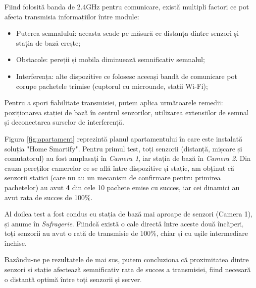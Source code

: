 Fiind folosită banda de 2.4GHz pentru comunicare, există multipli factori ce pot afecta transmisia informațiilor între module:
\begin{itemize}
	\item Puterea semnalului: aceasta scade pe măsură ce distanța dintre senzori și stația de bază crește;
	
	\item Obstacole: pereții și mobila diminuează semnificativ semnalul;
	
	\item Interferența: alte dispozitive ce folosesc aceeași bandă de comunicare pot corupe pachetele trimise (cuptorul cu microunde, stații Wi-Fi);
\end{itemize}

Pentru a spori fiabilitate transmisiei, putem aplica următoarele  remedii: poziționarea stației de bază în centrul senzorilor, utilizarea extensiilor de semnal și deconectarea surselor de interferență.

Figura \ref{fig:apartament} reprezintă planul apartamentului în care este instalată soluția "Home Smartify". Pentru primul test, toți senzorii (distanță, mișcare și comutatorul) au fost amplasați în \emph{Camera 1}, iar stația de bază în \emph{Camera 2}. Din cauza pereților camerelor ce se află între dispozitive și stație, am obținut că senzorii statici (care nu au un mecanism de confirmare pentru primirea pachetelor) au avut \textbf{4} din cele 10 pachete emise cu succes, iar cei dinamici au avut rata de succes de 100\%.

Al doilea test a fost condus cu stația de bază mai aproape de senzori (Camera 1), și anume în \emph{Sufragerie}. Fiindcă există o cale directă între aceste două încăperi, toți senzorii au avut o rată de transmisie de 100\%, chiar și cu ușile intermediare închise.

Bazându-ne pe rezultatele de mai sus, putem concluziona că proximitatea dintre senzori și stație afectează semnificativ rata de succes a transmisiei, fiind necesară o distanță optimă între toți senzorii și server.